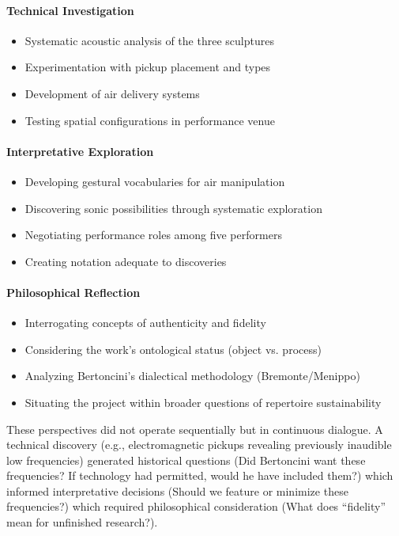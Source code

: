 \paragraph{Technical Investigation}
\begin{itemize}
  \item Systematic acoustic analysis of the three sculptures
  \item Experimentation with pickup placement and types
  \item Development of air delivery systems
  \item Testing spatial configurations in performance venue
\end{itemize}

\paragraph{Interpretative Exploration}
\begin{itemize}
  \item Developing gestural vocabularies for air manipulation
  \item Discovering sonic possibilities through systematic exploration
  \item Negotiating performance roles among five performers
  \item Creating notation adequate to discoveries
\end{itemize}

\paragraph{Philosophical Reflection}
\begin{itemize}
  \item Interrogating concepts of authenticity and fidelity
  \item Considering the work's ontological status (object vs. process)
  \item Analyzing Bertoncini's dialectical methodology (Bremonte/Menippo)
  \item Situating the project within broader questions of repertoire sustainability
\end{itemize}

These perspectives did not operate sequentially but in continuous dialogue. A 
technical discovery (e.g., electromagnetic pickups revealing previously 
inaudible low frequencies) generated historical questions (Did Bertoncini want 
these frequencies? If technology had permitted, would he have included them?) 
which informed interpretative decisions (Should we feature or minimize these 
frequencies?) which required philosophical consideration (What does ``fidelity'' 
mean for unfinished research?).

